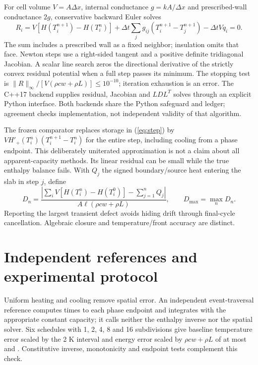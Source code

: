 \documentclass[10pt,a4paper]{article}
\begin{document}
For cell volume $V=A\Delta x$, internal conductance $g=kA/\Delta x$ and
prescribed-wall conductance $2g$, conservative backward Euler solves
\begin{equation}\label{eq:step}
R_i=V[H(T_i^{n+1})-H(T_i^n)]
 +\Delta t\sum_jg_{ij}(T_i^{n+1}-T_j^{n+1})-\Delta tVq_i=0.
\end{equation}
The sum includes a prescribed wall as a fixed neighbor; insulation omits that
face. Newton steps use a right-sided tangent and a positive definite
tridiagonal Jacobian. A scalar line search zeros the directional derivative
of the strictly convex residual potential when a full step passes its minimum.
The stopping test is $\|R\|_\infty/[V(\rho cw+\rho L)]\le10^{-10}$;
iteration exhaustion is an error. The C++17 backend supplies residual,
Jacobian and $LDL^T$ solves through an explicit Python interface. Both backends
share the Python safeguard and ledger; agreement checks implementation, not
independent validity of that algorithm.

The frozen comparator replaces storage in (\ref{eq:step}) by
$VH'_+(T_i^n)(T_i^{n+1}-T_i^n)$ for the entire step, including cooling from a
phase endpoint. This deliberately uniterated approximation is not a claim
about all apparent-capacity methods. Its linear residual can be small while
the true enthalpy balance fails. With $Q_j$ the signed boundary/source heat
entering the slab in step $j$, define
\begin{equation}
D_n=\frac{|\sum_iV[H(T_i^n)-H(T_i^0)]-\sum_{j=1}^nQ_j|}
{A\ell(\rho cw+\rho L)},\qquad D_{\max}=\max_nD_n.
\end{equation}
Reporting the largest transient defect avoids hiding drift through final-cycle
cancellation. Algebraic closure and temperature/front accuracy are distinct.

\newpage
\section{Independent references and experimental protocol}
Uniform heating and cooling remove spatial error. An independent
event-traversal reference computes times to each phase endpoint and integrates
with the appropriate constant capacity; it calls neither the enthalpy inverse
nor the spatial solver. Six schedules with 1, 2, 4, 8 and 16 subdivisions
give baseline temperature error scaled by the 2 K interval and energy
error scaled by $\rho cw+\rho L$ of at most
\texttt{\BaselineTemperature} and \texttt{\BaselineEnergy}.
Constitutive inverse, monotonicity and endpoint tests complement this check.
\end{document}
